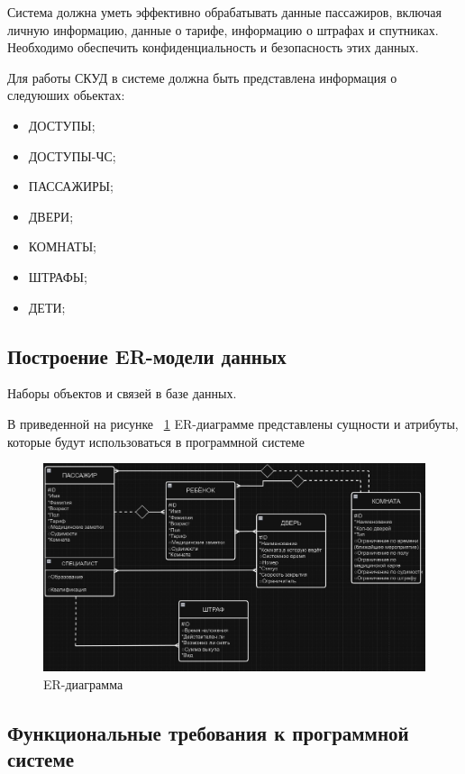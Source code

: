 Система должна уметь эффективно обрабатывать данные пассажиров, включая личную информацию, данные о тарифе, информацию о штрафах и спутниках. Необходимо обеспечить конфиденциальность и безопасность этих данных.

Для работы СКУД в системе должна быть представлена информация о следуюших обьектах:

\begin{itemize}
	\item ДОСТУПЫ;
	\item ДОСТУПЫ-ЧС;
	\item ПАССАЖИРЫ;
	\item ДВЕРИ;
	\item КОМНАТЫ;
	\item ШТРАФЫ;
	\item ДЕТИ;
\end{itemize}


\subsection{Построение ER-модели данных}

Наборы объектов и связей в базе данных.

В приведенной на рисунке ~\ref{fig:er} ER-диаграмме представлены сущности и атрибуты, которые будут использоваться в программной системе 

\begin{figure}[ht]
	\centering
	\includegraphics[width=1\linewidth]{images/ER}
	\caption{ER-диаграмма}
	\label{fig:er}
\end{figure}

\subsection{Функциональные требования к программной системе}

